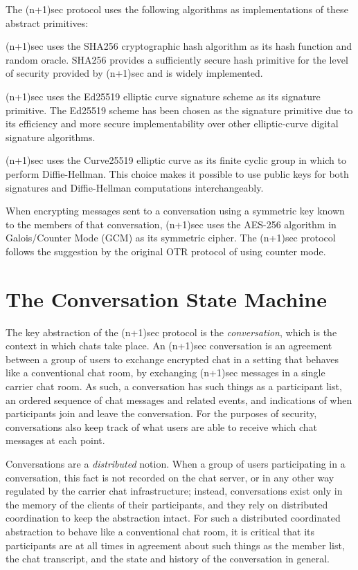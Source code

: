\documentclass{article}
\begin{document}
The (n+1)sec protocol uses the following algorithms as implementations of these abstract primitives:
\begin{description}[noitemsep]
\item[Cryptographic hash.] (n+1)sec uses the SHA256 cryptographic hash algorithm as its hash function and random oracle. SHA256 provides a sufficiently secure hash primitive for the level of security provided by (n+1)sec and is widely implemented.
\item[Signature scheme.] (n+1)sec uses the Ed25519 elliptic curve signature scheme as its signature primitive. The Ed25519 scheme has been chosen as the signature primitive due to its efficiency and more secure implementability over other elliptic-curve digital signature algorithms.
\item[Cyclic group.] (n+1)sec uses the Curve25519 elliptic curve as its finite cyclic group in which to perform Diffie-Hellman. This choice makes it possible to use public keys for both signatures and Diffie-Hellman computations interchangeably.
\item[Symmetric cipher.] When encrypting messages sent to a conversation using a symmetric key known to the members of that conversation, (n+1)sec uses the AES-256 algorithm in Galois/Counter Mode (GCM) as its symmetric cipher. The (n+1)sec protocol follows the suggestion by the original OTR protocol \cite{otr} of using counter mode.
\end{description}



\section{The Conversation State Machine}
\label{sec:conversation-state-machine}

The key abstraction of the (n+1)sec protocol is the \emph{conversation}, which is the context in which chats take place.
An (n+1)sec conversation is an agreement between a group of users to exchange encrypted chat in a setting that behaves like a conventional chat room, by exchanging (n+1)sec messages in a single carrier chat room.
As such, a conversation has such things as a participant list, an ordered sequence of chat messages and related events, and indications of when participants join and leave the conversation.
For the purposes of security, conversations also keep track of what users are able to receive which chat messages at each point.

Conversations are a \emph{distributed} notion.
When a group of users participating in a conversation, this fact is not recorded on the chat server, or in any other way regulated by the carrier chat infrastructure; instead, conversations exist only in the memory of the clients of their participants, and they rely on distributed coordination to keep the abstraction intact.
For such a distributed coordinated abstraction to behave like a conventional chat room, it is critical that its participants are at all times in agreement about such things as the member list, the chat transcript, and the state and history of the conversation in general.
\end{document}
